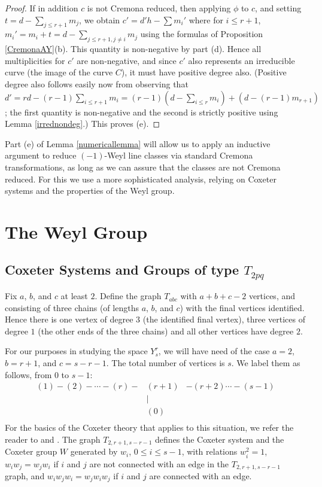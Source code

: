 \documentclass[12pt]{article}
\numberwithin{equation}{section}
\numberwithin{equation}{section}
\numberwithin{subeq}{equation}
\begin{document}
\begin{proof}
If in addition $c$ is not Cremona reduced,
then applying $\phi$ to $c$,
and setting $t = d-\sum_{j\leq r+1} m_j$, we obtain $c'=d'h-\sum m_i'$
where for $i \leq r+1$, $m_i' = m_i+t = d-\sum_{j \leq r+1, j\neq i} m_j$
using the formulas of Proposition \ref{CremonaAY}(b).
This quantity is non-negative by part (d).
Hence all multiplicities for $c'$ are non-negative,
and since $c'$ also represents an irreducible curve (the image of the curve $C$),
it must have positive degree also.
(Positive degree also follows easily now from observing that
$d' = rd-(r-1)\sum_{i\leq r+1} m_i
= (r-1)(d-\sum_{i\leq r} m_i) + (d-(r-1)m_{r+1})$;
the first quantity is non-negative 
and the second is strictly positive using Lemma \ref{irrednondeg}.)
This proves (e).

\end{proof}

Part (e) of Lemma \ref{numericallemma} will allow us to apply an inductive argument
to reduce $(-1)$-Weyl line classes via standard Cremona transformations,
as long as we can assure that the classes are not Cremona reduced.
For this we use a more sophisticated analysis,
relying on Coxeter systems and the properties of the Weyl group.

\section{The Weyl Group}\label{weyl section}

\subsection{Coxeter Systems and Groups of type $T_{2pq}$}
Fix $a$, $b$, and $c$ at least $2$.
Define the graph $T_{abc}$ with $a+b+c-2$ vertices,
and consisting of three chains
(of lengths $a$, $b$, and $c$) with the final vertices identified.
Hence there is one vertex of degree $3$ (the identified final vertex),
three vertices of degree $1$ (the other ends of the three chains)
and all other vertices have degree $2$.

For our purposes in studying the space $Y^r_s$,
we will have need of the case $a=2$, $b=r+1$, and $c = s-r-1$.
The total number of vertices is $s$.
We label them as follows, from $0$ to $s-1$:
\[
\begin{matrix}
(1)  -  (2)  -  \cdots  -  (r)  - &  (r+1) & -  (r+2)  \cdots  -  (s-1) \\
     &     |           &    \\
     &     (0)       &     \\
\end{matrix}
\]
For the basics of the Coxeter theory that applies to this situation,
we refer the reader to \cite{Bo} and \cite{Humphreys}.
The graph $T_{2,r+1,s-r-1}$ defines the Coxeter system
and the Coxeter group $W$
generated by $w_i$, $0 \leq i \leq s-1$,
with relations
$w_i^2=1$,
$w_iw_j = w_jw_i$ if $i$ and $j$ are not connected with an edge in the $T_{2,r+1,s-r-1}$ graph,
and $w_iw_jw_i = w_jw_iw_j$ if $i$ and $j$ are connected with an edge.
\end{document}
